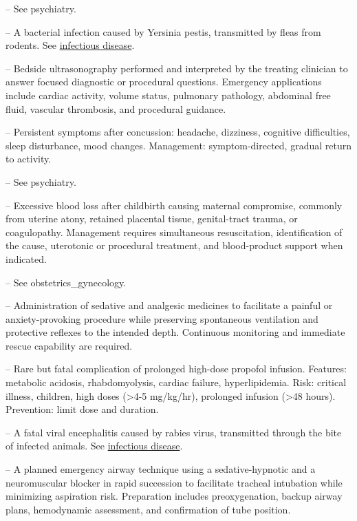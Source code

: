 -- See psychiatry.

-- A bacterial infection caused by Yersinia pestis, transmitted by fleas from rodents. See \hyperlink{Infectious Disease}{infectious disease}.

-- Bedside ultrasonography performed and interpreted by the treating clinician to answer focused diagnostic or procedural questions. Emergency applications include cardiac activity, volume status, pulmonary pathology, abdominal free fluid, vascular thrombosis, and procedural guidance.

-- Persistent symptoms after concussion: headache, dizziness, cognitive difficulties, sleep disturbance, mood changes. Management: symptom-directed, gradual return to activity.

-- See psychiatry.

-- Excessive blood loss after childbirth causing maternal compromise, commonly from uterine atony, retained placental tissue, genital-tract trauma, or coagulopathy. Management requires simultaneous resuscitation, identification of the cause, uterotonic or procedural treatment, and blood-product support when indicated.

-- See obstetrics\_gynecology.

-- Administration of sedative and analgesic medicines to facilitate a painful or anxiety-provoking procedure while preserving spontaneous ventilation and protective reflexes to the intended depth. Continuous monitoring and immediate rescue capability are required.

-- Rare but fatal complication of prolonged high-dose propofol infusion. Features: metabolic acidosis, rhabdomyolysis, cardiac failure, hyperlipidemia. Risk: critical illness, children, high doses (>4-5 mg/kg/hr), prolonged infusion (>48 hours). Prevention: limit dose and duration.

-- A fatal viral encephalitis caused by rabies virus, transmitted through the bite of infected animals. See \hyperlink{Infectious Disease}{infectious disease}.

-- A planned emergency airway technique using a sedative-hypnotic and a neuromuscular blocker in rapid succession to facilitate tracheal intubation while minimizing aspiration risk. Preparation includes preoxygenation, backup airway plans, hemodynamic assessment, and confirmation of tube position.

